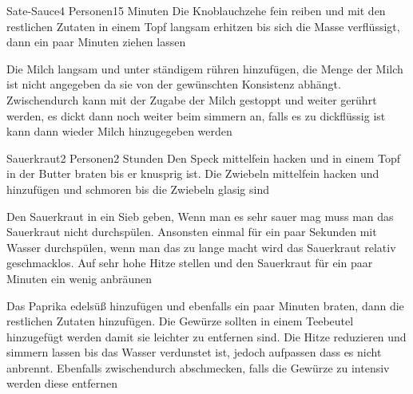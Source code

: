 
\begin{recipe}{Sate-Sauce}{4 Personen}{15 Minuten}
Die Knoblauchzehe fein reiben und mit den restlichen Zutaten in einem Topf langsam erhitzen bis sich die Masse verflüssigt, dann ein paar Minuten ziehen lassen

Die Milch langsam und unter ständigem rühren hinzufügen, die Menge der Milch ist nicht angegeben da sie von der gewünschten Konsistenz abhängt. Zwischendurch kann mit der Zugabe der Milch gestoppt und weiter gerührt werden, es dickt dann noch weiter beim simmern an, falls es zu dickflüssig ist kann dann wieder Milch hinzugegeben werden
\end{recipe}


\begin{recipe}{Sauerkraut}{2 Personen}{2 Stunden}
Den Speck mittelfein hacken und in einem Topf in der Butter braten bis er knusprig ist. Die Zwiebeln mittelfein hacken und hinzufügen und schmoren bis die Zwiebeln glasig sind

Den Sauerkraut in ein Sieb geben, Wenn man es sehr sauer mag muss man das Sauerkraut nicht durchspülen.
Ansonsten einmal für ein paar Sekunden mit Wasser durchspülen, wenn man das zu lange macht wird das Sauerkraut relativ geschmacklos. Auf sehr hohe Hitze stellen und den Sauerkraut für ein paar Minuten ein wenig anbräunen

Das Paprika edelsüß hinzufügen und ebenfalls ein paar Minuten braten, dann die restlichen Zutaten hinzufügen. Die Gewürze sollten in einem Teebeutel hinzugefügt werden damit sie leichter zu entfernen sind. Die Hitze reduzieren und simmern lassen bis das Wasser verdunstet ist, jedoch aufpassen dass es nicht anbrennt. Ebenfalls zwischendurch abschmecken, falls die Gewürze zu intensiv werden diese entfernen
\end{recipe}



